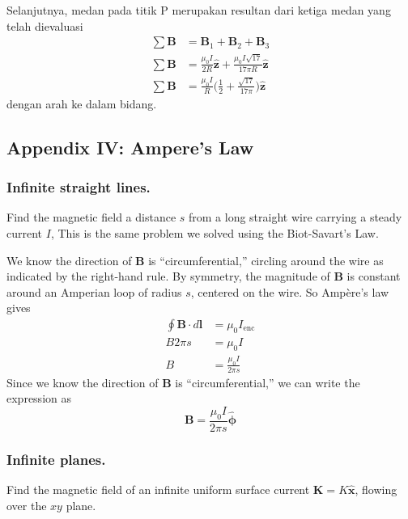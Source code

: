 \documentclass[../../../main.tex]{subfiles}
\begin{document}
Selanjutnya, medan pada titik P merupakan resultan dari ketiga medan yang telah dievaluasi
\begin{align*}
    \sum \mathbf{B}& =\mathbf{B}_1+\mathbf{B}_2+\mathbf{B}_3\\
    \sum \mathbf{B}& =\frac{\mu_0 I}{2R}\mathbf{\hat{z}}+\frac{\mu_0 I\sqrt{17}}{17\pi R} \mathbf{\hat{z}}\\
    \sum \mathbf{B}& =\frac{\mu_0 I}{R}\biggl(\frac{1}{2}+\frac{\sqrt{17}}{17\pi}\biggr)\mathbf{\hat{z}}
\end{align*}
dengan arah ke dalam bidang.

\subsection{Appendix IV: Ampere's Law}
\subsubsection{Inﬁnite straight lines.} Find the magnetic ﬁeld a distance $s$ from a long straight wire carrying a steady current $I$, This is the same problem we solved using the Biot-Savart's Law. 

We know the direction of \textbf{B} is “circumferential,” circling around the wire as indicated by the right-hand rule. By symmetry, the magnitude of \textbf{B} is constant around an Amperian loop of radius $s$, centered on the wire. So Ampère’s law gives
\begin{align*}
    \oint \mathbf{B}\cdot d\mathbf{l}&=\mu_0I_{\text{enc}}\\
    B2\pi s&=\mu_0I\\
    B&=\frac{\mu_0I}{2\pi s}
\end{align*}
Since we know the direction of \textbf{B} is “circumferential,” we can write the expression as 
\begin{equation*}
    \mathbf{B}=\frac{\mu_0I}{2\pi s}\boldsymbol{\hat{\phi}}
\end{equation*}
\begin{figure*}[ht]
    \centering
\end{figure*}

\subsubsection{Inﬁnite planes.} Find the magnetic ﬁeld of an inﬁnite uniform surface current 
$\mathbf{K} = K \mathbf{\hat{x}}$, ﬂowing over the $xy$ plane. 
\end{document}
